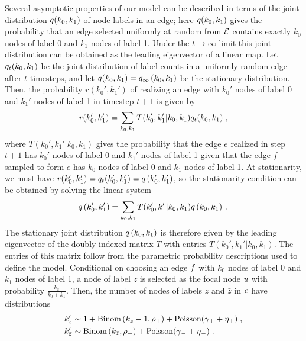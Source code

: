 \documentclass[aps,pre,reprint,superscriptaddress,nofootinbib]{revtex4-2}
\begin{document}
    Several asymptotic properties of our \model{} model can be described in terms of the joint distribution $q(k_0, k_1)$ of node labels in an edge; here $q(k_0, k_1)$ gives the probability that an edge selected uniformly at random from $\mathcal{E}$ contains exactly $k_0$ nodes of label 0 and $k_1$ nodes of label 1.
    Under the $t\rightarrow \infty$ limit this joint distribution can be obtained as the leading eigenvector of a linear map. 
    Let $q_{t}(k_0, k_1)$ be the joint distribution of label counts in a uniformly random edge after $t$ timesteps, and let $q(k_0, k_1) = q_{\infty} \left( k_0, k_1 \right)$ be the stationary distribution.
    Then, the probability $r(k_0', k_1')$ of realizing an edge with $k_0'$ nodes of label 0 and $k_1'$ nodes of label 1 in timestep $t+1$ is given by 
    \begin{align*}
        r(k_0', k_1') = \sum_{k_0, k_1} T(k_0', k_1' | k_0, k_1)q_{t}(k_0, k_1)  \;,
    \end{align*}
    where $T(k_0', k_1' | k_0, k_1)$ gives the probability that the edge $e$ realized in step $t+1$ has $k_0'$ nodes of label 0 and $k_1'$ nodes of label 1 given that the edge $f$ sampled to form $e$ has $k_0$ nodes of label 0 and $k_1$ nodes of label 1.
    At stationarity, we must have $r(k_0', k_1') = q_{t}(k_0', k_1') = q \left( k_0', k_1' \right)$, so the stationarity condition can be obtained by solving the linear system 
    \begin{align*}
        q \left( k_0', k_1' \right) = \sum_{k_0, k_1} T(k_0', k_1' | k_0, k_1)q \left( k_0, k_1 \right)  \;.
    \end{align*}
    The stationary joint distribution $q \left( k_0, k_1 \right)$ is therefore given by the leading eigenvector of the doubly-indexed matrix $T$ with entries $T(k_0', k_1' | k_0, k_1)$. 
    The entries of this matrix follow from the parametric probability descriptions used to define the \model{} model.
    Conditional on choosing an edge $f$ with $k_0$ nodes of label 0 and $k_1$ nodes of label 1, a node of label $z$ is selected as the focal node $u$ with probability $\frac{k_z}{k_0 + k_1}$.
    Then, the number of nodes of labels $z$ and $\bar{z}$ in $e$ have distributions
    \begin{align*}
        k_z' &\sim 1 + \text{Binom}\left( k_z - 1, \rho{}_+ \right) + \text{Poisson}(\gamma{}_+ + \eta{}_+) \;, \\
        k_{\bar{z}}' &\sim \text{Binom}\left( k_{\bar{z}}, \rho{}_- \right) + \text{Poisson}(\gamma{}_- + \eta{}_-) \;.
    \end{align*}
\end{document}
